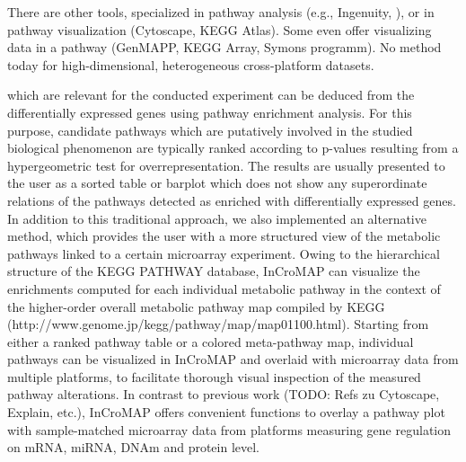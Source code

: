 \documentclass{bioinfo}
\begin{document}


There are other tools, specialized in pathway analysis (e.g., Ingenuity, ), or in pathway
visualization (Cytoscape, KEGG Atlas). Some even offer visualizing data in a pathway (GenMAPP, KEGG
Array, Symons programm). No method today for high-dimensional, heterogeneous cross-platform
datasets.

which are relevant for the conducted experiment can be deduced from the differentially expressed
genes using pathway enrichment analysis. For this purpose, candidate pathways which are putatively
involved in the studied biological phenomenon are typically ranked according to p-values resulting
from a hypergeometric test for overrepresentation. The results are usually presented to the user as
a sorted table or barplot which does not show any superordinate relations of the pathways detected
as enriched with differentially expressed genes. In addition to this traditional approach, we also
implemented an alternative method, which provides the user with a more structured view of the
metabolic pathways linked to a certain microarray experiment. Owing to the hierarchical structure of
the KEGG PATHWAY database, InCroMAP can visualize the enrichments computed for each individual
metabolic pathway in the context of the higher-order overall metabolic pathway map compiled by KEGG
(http://www.genome.jp/kegg/pathway/map/map01100.html). Starting from either a ranked pathway table
or a colored meta-pathway map, individual pathways can be visualized in InCroMAP and overlaid with
microarray data from multiple platforms, to facilitate thorough visual inspection of the measured
pathway alterations. In contrast to previous work (TODO: Refs zu Cytoscape, Explain, etc.), InCroMAP
offers convenient functions to overlay a pathway plot with sample-matched microarray data from
platforms measuring gene regulation on mRNA, miRNA, DNAm and protein level.
\end{document}
